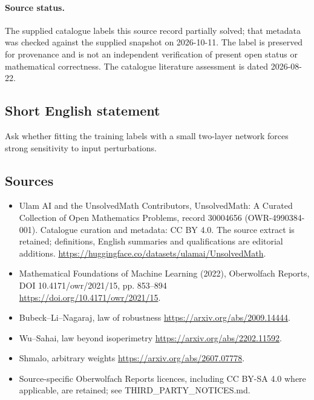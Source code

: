 \documentclass[11pt]{article}
\begin{document}
\paragraph{Source status.}
The supplied catalogue labels this source record partially solved; that metadata was checked against the supplied snapshot on 2026-10-11. The label is preserved for provenance and is not an independent verification of present open status or mathematical correctness. The catalogue literature assessment is dated 2026-08-22.
\subsection{Short English statement}
Ask whether fitting the training labels with a small two-layer network forces strong sensitivity to input perturbations.
\subsection{Sources}
\begin{itemize}
\item[\hypertarget{source:30004656:1}{S1}] Ulam AI and the UnsolvedMath Contributors, UnsolvedMath: A Curated Collection of Open Mathematics Problems, record 30004656 (OWR-4990384-001). Catalogue curation and metadata: CC BY 4.0. The source extract is retained; definitions, English summaries and qualifications are editorial additions.
\url{https://huggingface.co/datasets/ulamai/UnsolvedMath}.
\item[\hypertarget{source:30004656:2}{S2}] Mathematical Foundations of Machine Learning (2022), Oberwolfach Reports, DOI 10.4171/owr/2021/15, pp. 853--894
\url{https://doi.org/10.4171/owr/2021/15}.
\item[\hypertarget{source:30004656:3}{S3}] Bubeck--Li--Nagaraj, law of robustness
\url{https://arxiv.org/abs/2009.14444}.
\item[\hypertarget{source:30004656:4}{S4}] Wu--Sahai, law beyond isoperimetry
\url{https://arxiv.org/abs/2202.11592}.
\item[\hypertarget{source:30004656:5}{S5}] Shmalo, arbitrary weights
\url{https://arxiv.org/abs/2607.07778}.
\item Source-specific Oberwolfach Reports licences, including CC BY-SA 4.0 where applicable, are retained; see THIRD\_PARTY\_NOTICES.md.
\end{itemize}
\end{document}
